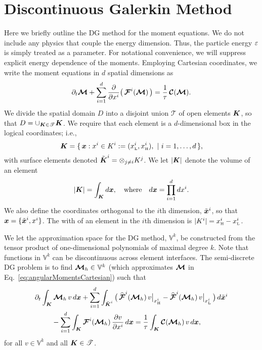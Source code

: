 \section{Discontinuous Galerkin Method}
\label{sec:dg}

Here we briefly outline the DG method for the moment equations.  
We do not include any physics that couple the energy dimension.  
Thus, the particle energy $\varepsilon$ is simply treated as a parameter.  
For notational convenience, we will suppress explicit energy dependence of the moments.  
Employing Cartesian coordinates, we write the moment equations in $d$ spatial dimensions as
\begin{equation}
  \partial_{t}{\boldsymbol{\mathcal{M}}}+\sum_{i=1}^{d}\frac{\partial }{\partial x^{i}}\big(\,\boldsymbol{\mathcal{F}}^{i}(\boldsymbol{\mathcal{M}})\,\big)
  =\frac{1}{\tau}\,\boldsymbol{\mathcal{C}}(\boldsymbol{\mathcal{M}}).  
  \label{eq:angularMomentsCartesian}
\end{equation}
We divide the spatial domain $D$ into a disjoint union $\mathscr{T}$ of open elements $\boldsymbol{K}$, so that $D = \cup_{\boldsymbol{K} \in \mathscr{T}}\boldsymbol{K}$.  
We require that each element is a $d$-dimensional box in the logical coordinates; i.e.,
\begin{equation}
  \boldsymbol{K}=\{\,\boldsymbol{x} : x^{i} \in K^{i} := (x_{\mbox{\tiny L}}^{i},x_{\mbox{\tiny H}}^{i}),~|~i=1,\ldots,d\,\}, 
\end{equation}
with surface elements denoted $\tilde{\boldsymbol{K}}^{i}=\otimes_{j\ne i}K^{j}$.  
We let $|\boldsymbol{K}|$ denote the volume of an element
\begin{equation}
  |\boldsymbol{K}| = \int_{\boldsymbol{K}}d\boldsymbol{x}, \quad\text{where}\quad d\boldsymbol{x} = \prod_{i=1}^{d}dx^{i}.  
\end{equation}
We also define the coordinates orthogonal to the $i$th dimension, $\tilde{\boldsymbol{x}}^{i}$, so that $\boldsymbol{x}=\{\tilde{\boldsymbol{x}}^{i},x^{i}\}$.  
The with of an element in the $i$th dimension is $|K^{i}|=x_{\mbox{\tiny H}}^{i}-x_{\mbox{\tiny L}}^{i}$.  

We let the approximation space for the DG method, $\mathbb{V}^{k}$, be constructed from the tensor product of one-dimensional polynomials of maximal degree $k$.  
Note that functions in $\mathbb{V}^{k}$ can be discontinuous across element interfaces.  
The semi-discrete DG problem is to find $\boldsymbol{\mathcal{M}}_{h}\in\mathbb{V}^{k}$ (which approximates $\boldsymbol{\mathcal{M}}$ in Eq.~\eqref{eq:angularMomentsCartesian}) such that
\begin{align}
  &\partial_{t}{}\int_{\boldsymbol{K}}\boldsymbol{\mathcal{M}}_{h}\,v\,d\boldsymbol{x}
  +\sum_{i=1}^{d}\int_{\tilde{\boldsymbol{K}}^{i}}
  \big(\,
    \widehat{\boldsymbol{\mathcal{F}}}^{i}(\boldsymbol{\mathcal{M}}_{h})\,v\big|_{x_{\mbox{\tiny H}}^{i}}
    -\widehat{\boldsymbol{\mathcal{F}}}^{i}(\boldsymbol{\mathcal{M}}_{h})\,v\big|_{x_{\mbox{\tiny L}}^{i}}
  \,\big)\,d\tilde{\boldsymbol{x}}^{i} \nonumber \\
  &\hspace{24pt}
  -\sum_{i=1}^{d}\int_{\boldsymbol{K}}\boldsymbol{\mathcal{F}}^{i}(\boldsymbol{\mathcal{M}}_{h})\,\frac{\partial v}{\partial x^{i}}\,d\boldsymbol{x}
  =\frac{1}{\tau}\int_{\boldsymbol{K}}\boldsymbol{\mathcal{C}}(\boldsymbol{\mathcal{M}}_{h})\,v\,d\boldsymbol{x},
  \label{eq:semidiscreteDG}
\end{align}
for all $v\in\mathbb{V}^{k}$ and all $\boldsymbol{K}\in\mathscr{T}$.  

